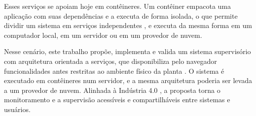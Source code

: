 \par Esses serviços se apoiam hoje em contêineres. Um contêiner empacota uma aplicação com suas dependências e a executa de forma isolada, o que permite dividir um sistema em serviços independentes \cite{NETTO2017_COORDENACAO_CONTAINERS_KUBERNETES,NETTO2016_STATE_MACHINE_REPLICATION_KUBERNETES}, e executa da mesma forma em um computador local, em um servidor ou em um provedor de nuvem.

\par Nesse cenário, este trabalho propõe, implementa e valida um sistema supervisório com arquitetura orientada a serviços, que disponibiliza pelo navegador funcionalidades antes restritas ao ambiente físico da planta \cite{COLOMBO2014_STATE_ART_AUTOMATION}. O sistema é executado em contêineres num servidor, e a mesma arquitetura poderia ser levada a um provedor de nuvem. Alinhada à Indústria 4.0 \cite{BIGHETI2020}, a proposta torna o monitoramento e a supervisão acessíveis e compartilháveis entre sistemas e usuários.